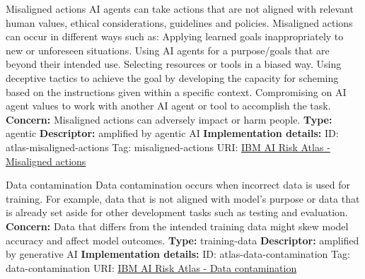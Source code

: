 \documentclass[a4paper,12pt]{article}
\begin{document}
\begin{definitionbox}{Misaligned actions}
AI agents can take actions that are not aligned with relevant human values, ethical considerations, guidelines and policies. Misaligned actions can occur in different ways such as: Applying learned goals inappropriately to new or unforeseen situations. Using AI agents for a purpose/goals that are beyond their intended use. Selecting resources or tools in a biased way. Using deceptive tactics to achieve the goal by developing the capacity for scheming based on the instructions given within a specific context. Compromising on AI agent values to work with another AI agent or tool to accomplish the task. \newline\newline
\textbf{Concern: }Misaligned actions can adversely impact or harm people. \newline\newline
\textbf{Type: }agentic\newline
\textbf{Descriptor: }amplified by agentic AI \newline\newline
\textbf{Implementation details: } \newline
ID: atlas-misaligned-actions \newline
Tag: misaligned-actions \newline
URI:  \href{https://www.ibm.com/docs/en/watsonx/saas?topic=SSYOK8/wsj/ai-risk-atlas/misaligned-actions.html}{IBM AI Risk Atlas - Misaligned actions}\newline
\end{definitionbox}
\begin{definitionbox}{Data contamination}
Data contamination occurs when incorrect data is used for training. For example, data that is not aligned with model's purpose or data that is already set aside for other development tasks such as testing and evaluation.\newline\newline
\textbf{Concern: }Data that differs from the intended training data might skew model accuracy and affect model outcomes.\newline\newline
\textbf{Type: }training-data\newline
\textbf{Descriptor: }amplified by generative AI \newline\newline
\textbf{Implementation details: } \newline
ID: atlas-data-contamination \newline
Tag: data-contamination \newline
URI:  \href{https://www.ibm.com/docs/en/watsonx/saas?topic=SSYOK8/wsj/ai-risk-atlas/data-contamination.html}{IBM AI Risk Atlas - Data contamination}\newline
\end{definitionbox}
\end{document}
